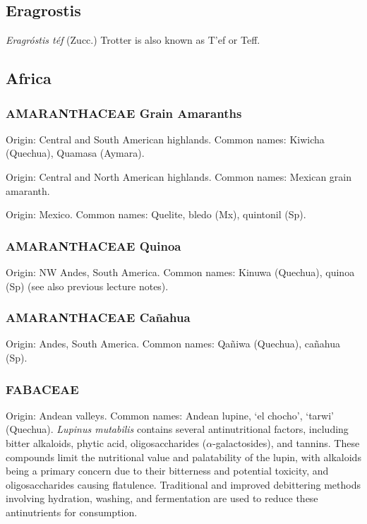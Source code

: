 \subsection{Eragrostis} 
\textit{Eragróstis téf} (Zucc.) Trotter is also known as T'ef or Teff.

\subsection{Africa} 
\subsubsection*{AMARANTHACEAE Grain Amaranths} 

Origin: Central and South American highlands. Common names: Kiwicha (Quechua), Quamasa (Aymara).

Origin: Central and North American highlands. Common names: Mexican grain amaranth.

Origin: Mexico. Common names: Quelite, bledo (Mx), quintonil (Sp).

\subsubsection*{AMARANTHACEAE Quinoa} 
Origin: NW Andes, South America. Common names: Kinuwa (Quechua), quinoa (Sp) (see also previous lecture notes).

\subsubsection*{AMARANTHACEAE Cañahua} 
Origin: Andes, South America. Common names: Qañiwa (Quechua), cañahua (Sp).

\subsubsection*{FABACEAE} 
Origin: Andean valleys. Common names: Andean lupine, ‘el chocho’, ‘tarwi’ (Quechua). \textit{Lupinus mutabilis} contains several antinutritional factors, including bitter alkaloids, phytic acid, oligosaccharides ($\alpha$-galactosides), and tannins. These compounds limit the nutritional value and palatability of the lupin, with alkaloids being a primary concern due to their bitterness and potential toxicity, and oligosaccharides causing flatulence. Traditional and improved debittering methods involving hydration, washing, and fermentation are used to reduce these antinutrients for consumption.

